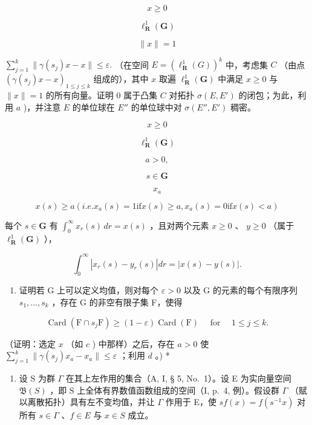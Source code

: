 \[
x \geqslant 0
\]

\[
\ell_ {\mathbf {R}} ^ {1} (\mathbf {G})
\]

\[
\| x \| = 1
\]

\(\sum_{j=1}^{k}\|\gamma(s_j)x - x\| \leqslant \varepsilon.\) （在空间 \(E = (\ell_{\mathbf{R}}^1(G))^k\) 中，考虑集 \(C\) （由点 \((\gamma(s_j)x - x)_{1\leqslant j\leqslant k}\) 组成的），其中 \(x\) 取遍 \(\ell_{\mathbf{R}}^{1}(\mathbf{G})\) 中满足 \(x \geqslant 0\) 与 \(\| x \| = 1\) 的所有向量。证明 0 属于凸集 \(C\) 对拓扑 \(\sigma(E, E')\) 的闭包；为此，利用 \(a\) )，并注意 \(E\) 的单位球在 \(E''\) 的单位球中对 \(\sigma(E'', E')\) 稠密。

\[
x \geqslant 0
\]

\[
\ell_ {\mathbf {R}} ^ {1} (\mathbf {G})
\]

\[
a > 0,
\]

\[
s \in \mathbf {G}
\]

\[
x _ {a}
\]

\[
x (s) \geqslant a (i. e. x _ {a} (s) = 1 \text {if} x (s) \geqslant a, x _ {a} (s) = 0 \text {if} x (s) <   a)
\]

每个 \(s \in \mathbf{G}\) 有 \(\int_{0}^{\infty} x_r(s) \, dr = x(s)\) ，且对两个元素 \(x \geqslant 0\) 、 \(y \geqslant 0\) （属于 \(\ell_{\mathbf{R}}^{1}(\mathbf{G})\) ），

\[
\int_ {0} ^ {\infty} \left| x _ {r} (s) - y _ {r} (s) \right| d r = \left| x (s) - y (s) \right|.
\]

\begin{enumerate}
\def\labelenumi{\alph{enumi})}
\setcounter{enumi}{4}
\tightlist
\item
  证明若 G 上可以定义均值，则对每个 \(\varepsilon > 0\) 以及 G 的元素的每个有限序列 \(s_1, \ldots, s_k\) ，存在 G 的非空有限子集 F，使得
\end{enumerate}

\[
\operatorname{Card} (\mathrm{F} \cap s _ {j} \mathrm{F}) \geqslant (1 - \varepsilon) \operatorname{Card} (\mathrm{F}) \quad \text { for } \quad 1 \leqslant j \leqslant k.
\]

（证明：选定 \(x\) （如 \(c\) ) 中那样）之后，存在 \(a > 0\) 使 \(\sum_{j=1}^{k} \| \gamma(s_j) x_a - x_a \| \leqslant \varepsilon\) ；利用 \(d\) 。) *

\begin{enumerate}
\def\labelenumi{\arabic{enumi})}
\setcounter{enumi}{5}
\tightlist
\item
  设 S 为群 \(\Gamma\) 在其上左作用的集合（A, I, § 5, No.~1）。设 E 为实向量空间 \(\mathfrak{B}(S)\) ，即 S 上全体有界数值函数组成的空间（I, p.~4, 例）。假设群 \(\Gamma\) （赋以离散拓扑）具有左不变均值，并让 \(\Gamma\) 作用于 E，使 \(sf(x) = f(s^{-1}x)\) 对所有 \(s \in \Gamma\) 、\(f \in E\) 与 \(x \in S\) 成立。
\end{enumerate}

